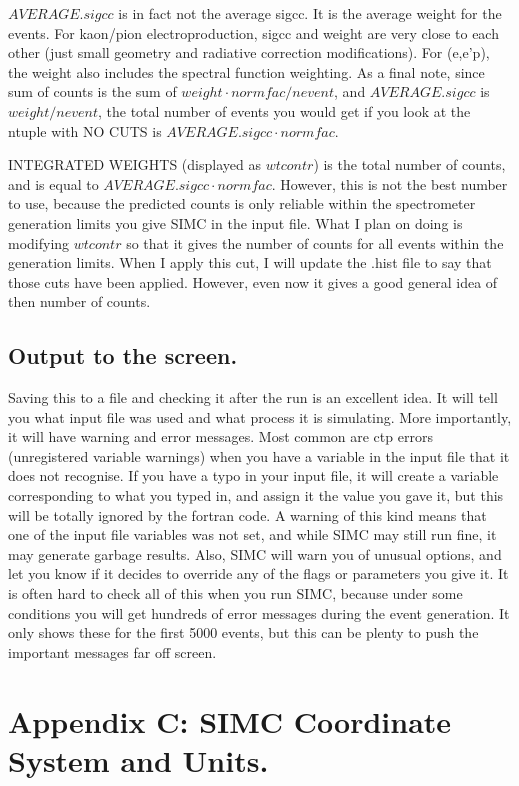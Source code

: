 $AVERAGE.sigcc$ is in fact not the average sigcc.  It is the average weight 
for the events.  For kaon/pion electroproduction, sigcc and weight are very
close to each other (just small geometry and radiative correction modifications).
For (e,e'p), the weight also includes the spectral function weighting.
As a final note, since sum of counts is the sum of $weight \cdot normfac /
nevent$, and $AVERAGE.sigcc$ is $weight / nevent$, the total number of events
you would get if you look at the ntuple with NO CUTS is $AVERAGE.sigcc \cdot
normfac$.

INTEGRATED WEIGHTS (displayed as $wtcontr$) is the total number of counts, and
is equal to $AVERAGE.sigcc \cdot normfac$.  However, this is not the best number
to use, because the predicted counts is only reliable within the spectrometer
generation limits you give SIMC in the input file.  What I plan on doing is
modifying $wtcontr$ so that it gives the number of counts for all events within
the generation limits.  When I apply this cut, I will update the .hist file
to say that those cuts have been applied.  However, even now it gives a good
general idea of then number of counts.

\subsection{Output to the screen.}

Saving this to a file and checking it after the run is an excellent idea.
It will tell you what input file was used and what process it is simulating.
More importantly, it will have warning and error messages.  Most common
are ctp errors (unregistered variable warnings) when you have a variable
in the input file that it does not recognise.  If you have a typo in your
input file, it will create a variable corresponding to what you typed in,
and assign it the value you gave it, but this will be totally ignored by
the fortran code.  A warning of this kind means that one of the input file
variables was not set, and while SIMC may still run fine, it may generate
garbage results.  Also, SIMC will warn you of unusual options, and let you
know if it decides to override any of the flags or parameters you give it.
It is often hard to check all of this when you run SIMC, because under some
conditions you will get hundreds of error messages during the event generation.
It only shows these for the first 5000 events, but this can be plenty to
push the important messages far off screen.


\section{Appendix C: SIMC Coordinate System and Units.}

